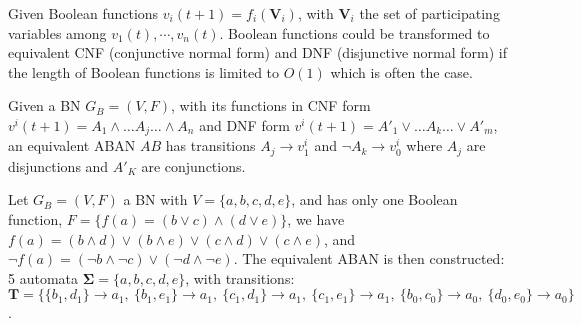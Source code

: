 \documentclass[runningheads]{llncs}
\newcommand{\acm}[3]{\{#1\}\rightarrow#3}
\begin{document}
Given Boolean functions $v_i(t+1)=f_i(\mathbf{V}_i)$, with $\mathbf{V}_i$ the set of participating variables among $v_1(t),\cdots,v_n(t)$.
Boolean functions could be transformed to equivalent CNF (conjunctive normal form) and DNF (disjunctive normal form) if the length of Boolean functions is limited to $O(1)$ \cite{miltersen2005converting} which is often the case.
\begin{proposition}
Given a BN $G_B=(V,F)$, with its functions in CNF form $v^i(t+1)=A_1\land\ldots A_j \ldots\land A_n$ and DNF form $v^i(t+1)=A'_1\lor\ldots A_k\ldots\lor A'_m$, an equivalent ABAN $AB$ has transitions $A_j\to v^i_1$ and $\lnot A_k\to v^i_0$ where $A_j$ are disjunctions and $A'_K$ are conjunctions.
\end{proposition}
\begin{example}
Let $G_B=(V,F)$ a BN with $V=\{a,b,c,d,e\}$, and has only one Boolean function, $F=\{f(a)= (b\lor c)\land(d\lor e)\}$, we have 
$f(a)=(b\land d)\lor(b\land e)\lor(c\land d)\lor(c\land e)$, and $\lnot f(a)=(\lnot b\land \lnot c)\lor(\lnot d\land \lnot e)$. 
The equivalent ABAN is then constructed: 5 automata $\mathbf{\Sigma}=\{a,b,c,d,e\}$, with transitions: $\mathbf{T}=\{\acm{b_1,d_1}{a_0}{a_1},\ \acm{b_1,e_1}{a_0}{a_1},\ \acm{c_1,d_1}{a_0}{a_1},\ \acm{c_1,e_1}{a_0}{a_1},\ \acm{b_0,c_0}{a_1}{a_0},\ \acm{d_0,e_0}{a_1}{a_0}\}$.
\end{example}
\end{document}
